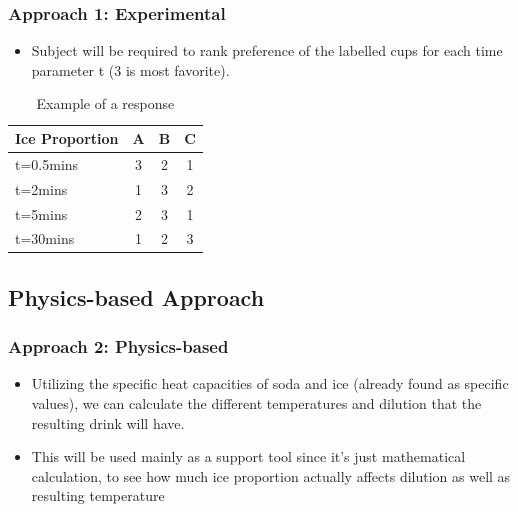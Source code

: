 \documentclass[compress,handout,10pt]{beamer}
\let\olditem\item
\renewcommand{\item}{\setlength{\itemsep}{0.5\baselineskip}\olditem}
\begin{document}
\begin{frame}
    \frametitle{Approach 1: Experimental}

\begin {itemize}

\item Subject will be required to rank preference of the labelled cups for each time parameter t (3 is most favorite).
\end{itemize}
\vspace{6pt}

\begin{table}[ h]
\centering
\begin{tabular}{ l | c|c|c }
  Ice Proportion & A  & B & C  \\
\hline  
t=0.5mins & 3&2 &1\\ 
\hline  
t=2mins &1 &3 &2\\ 
\hline  
t=5mins  &2 &3 &1\\ 
\hline  
t=30mins &1 &2 &3\\ 
\hline  
   
 \end{tabular}
\caption{Example of a response}

\end{table}

\end{frame}


\subsection{Physics-based Approach}
\begin{frame}
    \frametitle{Approach 2: Physics-based}

\begin {itemize}
\item Utilizing the specific heat capacities of soda and ice (already found as specific values), we can calculate the different temperatures and dilution that the resulting drink will have.

\item This will be used mainly as a support tool since it's just mathematical calculation, to see how much ice proportion actually affects dilution as well as resulting temperature
\end{itemize}

\end{frame}
\end{document}
